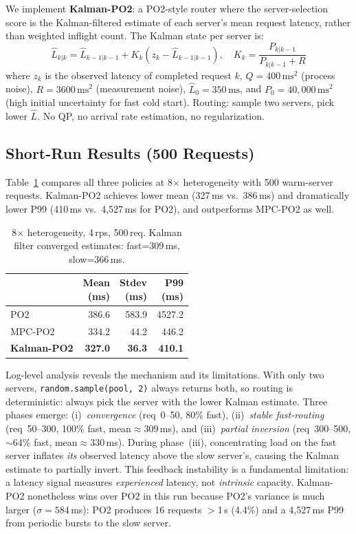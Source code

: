 \documentclass[blind]{gtac}
\begin{document}
We implement \textbf{Kalman-PO2}: a PO2-style router where the
server-selection score is the Kalman-filtered estimate of each server's
mean request latency, rather than weighted inflight count. The Kalman
state per server is:
\[
  \hat{L}_{k|k} = \hat{L}_{k-1|k-1} + K_k(z_k - \hat{L}_{k-1|k-1}),
  \quad K_k = \frac{P_{k|k-1}}{P_{k|k-1} + R}
\]
where $z_k$ is the observed latency of completed request $k$,
$Q=400\,\text{ms}^2$ (process noise), $R=3600\,\text{ms}^2$
(measurement noise), $\hat{L}_0=350\,\text{ms}$, and
$P_0=40{,}000\,\text{ms}^2$ (high initial uncertainty for fast cold
start). Routing: sample two servers, pick lower $\hat{L}$. No QP, no
arrival rate estimation, no regularization.

\subsection{Short-Run Results (500 Requests)}
\label{sec:kalman-short}

Table~\ref{tab:kalman} compares all three policies at 8$\times$
heterogeneity with 500 warm-server requests. Kalman-PO2 achieves lower
mean (327\,ms vs.\ 386\,ms) and dramatically lower P99 (410\,ms vs.\
4,527\,ms for PO2), and outperforms MPC-PO2 as well.

\begin{table}[h]
\centering
\caption{8$\times$ heterogeneity, 4\,rps, 500\,req. Kalman filter
         converged estimates: fast=309\,ms, slow=366\,ms.}
\label{tab:kalman}
\small
\begin{tabular}{@{}l r r r@{}}
\toprule
\thead{Policy} & \thead{Mean\\(ms)} & \thead{Stdev\\(ms)} & \thead{P99\\(ms)} \\
\midrule
PO2        & 386.6 & 583.9 & 4527.2 \\
MPC-PO2    & 334.2 &  44.2 &  446.2 \\
\textbf{Kalman-PO2} & \textbf{327.0} & \textbf{36.3} & \textbf{410.1} \\
\bottomrule
\end{tabular}
\end{table}

Log-level analysis reveals the mechanism and its limitations. With
only two servers, \texttt{random.sample(pool,\,2)} always returns
both, so routing is deterministic: always pick the server with the
lower Kalman estimate. Three phases emerge: (i)~\emph{convergence}
(req~0--50, 80\% fast), (ii)~\emph{stable fast-routing}
(req~50--300, 100\% fast, mean$\approx$309\,ms), and
(iii)~\emph{partial inversion} (req~300--500, $\sim$64\% fast,
mean$\approx$330\,ms). During phase~(iii), concentrating load on
the fast server inflates \emph{its} observed latency above the slow
server's, causing the Kalman estimate to partially invert. This
feedback instability is a fundamental limitation: a latency signal
measures \emph{experienced} latency, not \emph{intrinsic} capacity.
Kalman-PO2 nonetheless wins over PO2 in this run because PO2's
variance is much larger ($\sigma=584$\,ms): PO2 produces 16 requests
$>$1\,s (4.4\%) and a 4,527\,ms P99 from periodic bursts to the slow
server.
\end{document}
